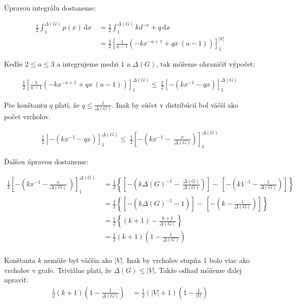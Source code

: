 Úpravou integrálu dostaneme:

\begin{align*}
\frac{1}{2}\int_1^{\Delta (G)} \! p(x) \, \mathrm{d}x \
&= \frac{1}{2}\int_1^{\Delta (G)} \! kd^{-a} + q \, \mathrm{d}x \\
&= \frac{1}{2}\left[\frac{1}{a - 1} \left(- k x^{- a + 1} + q x \
\left(a - 1\right)\right)\right]_1^{|V|}
\end{align*}

Keďže $2 \leq a \leq 3$ a integrujeme medzi $1$ a $\Delta (G)$, tak môžeme 
ohraničiť výpočet:

\begin{align*}
\frac{1}{2}\left[\frac{1}{a - 1} \left(- k x^{- a + 1} + q x \
\left(a - 1\right)\right)\right]_1^{\Delta (G)} \leq \
\frac{1}{2}\left[- \left( k x^{- 1} - q x \right)\right]_1^{\Delta (G)}
\end{align*}

Pre konštantu $q$ platí, že $q \leq \frac{1}{\Delta (G)}$. Inak by súčet v 
distribúcií bol väčší ako počet vrcholov.

\begin{align*}
\frac{1}{2}\left[- \left( k x^{- 1} - q x \right)\right]_1^{\Delta (G)} \leq \
\frac{1}{2}\left[- \left( k x^{- 1} - \
\frac{x}{\Delta (G)} \right)\right]_1^{\Delta (G)} 
\end{align*}

Ďalšou úpravou dostaneme:

\begin{align*}
\frac{1}{2}\left[- \left( k x^{- 1} - \frac{x}{\Delta (G)} \
\right)\right]_1^{\Delta (G)} \
\!\!\!\!&= \frac{1}{2}\left\{\left[- \left( k \Delta (G)^{- 1} - \
\frac{\Delta (G)}{\Delta (G)}\right)\right] - \
\left[- \left( k 1^{- 1} - \frac{1}{\Delta (G)}\right)\right] \right\}\\
&= \frac{1}{2}\left\{\left[- \left( k \Delta (G)^{- 1} - 1 \right)\right] - \
\left[- \left( k - \frac{1}{\Delta (G)} \right)\right] \right\} \\
&= \frac{1}{2}\left\{\left(k + 1\right) - \frac{k+1}{\Delta (G)} \right\}\\
&= \frac{1}{2}\left(k + 1\right)\left( 1 - \frac{1}{\Delta (G)} \right)\\
\end{align*}

Konštanta $k$ nemôže byť väčšia ako $|V|$. Inak by vrcholov stupňa 1 bolo viac 
ako vrcholov v grafe. Triviálne platí, že $\Delta (G) \leq |V|$. Takže 
odhad môžeme ďalej upraviť:
\begin{align*}
\frac{1}{2}\left(k + 1\right)\left( 1 - \frac{1}{\Delta (G)} \right)\
&=\frac{1}{2}\left(|V| + 1\right)\left( 1 - \frac{1}{|V|} \right)
\end{align*}

